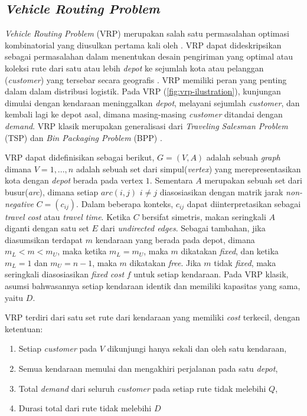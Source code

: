 \subsection{\textit{Vehicle Routing Problem}}
\label{ssec:vrp}
\textit{Vehicle Routing Problem} (VRP) merupakan salah satu permasalahan optimasi kombinatorial yang diusulkan pertama kali oleh \citep{dantzig_truck_1959}. VRP dapat dideskripsikan sebagai permasalahan dalam menentukan desain pengiriman yang optimal atau koleksi rute dari satu atau lebih \textit{depot} ke sejumlah kota atau pelanggan (\textit{customer}) yang tersebar secara geografis \citep{laporte_vehicle_1992}. VRP memiliki peran yang penting dalam dalam distribusi logistik. Pada VRP (\autoref{fig:vrp-ilustration}), kunjungan dimulai dengan kendaraan meninggalkan \textit{depot}, melayani sejumlah \textit{customer}, dan kembali lagi ke depot asal, dimana masing-masing \textit{customer} ditandai dengan \textit{demand}. VRP klasik merupakan generalisasi dari \textit{Traveling Salesman Problem} (TSP) dan \textit{Bin Packaging Problem} (BPP) \citep{garey_computers_2002}.


VRP dapat didefinisikan sebagai berikut, $G = (V, A)$ adalah sebuah \textit{graph} dimana $V = {1,...,n}$ adalah sebuah set dari simpul(\textit{vertex}) yang merepresentasikan kota dengan \textit{depot} berada pada vertex $1$. Sementara $A$ merupakan sebuah set dari busur(\textit{arc}), dimana setiap $arc(i, j)$ $i \neq j$ diasosiasikan dengan matrik jarak \textit{non-negative} $C = (c_{ij})$. Dalam beberapa konteks, $c_{ij}$ dapat diinterpretasikan sebagai \textit{travel cost} atau \textit{travel time}. Ketika $C$ bersifat simetris, makan seringkali $A$ diganti dengan satu set $E$ dari \textit{undirected edges}. Sebagai tambahan, jika diasumsikan terdapat $m$ kendaraan yang berada pada depot, dimana $m_L < m < m_U$, maka ketika $m_L = m_U$, maka $m$ dikatakan \textit{fixed}, dan ketika $m_L = 1$ dan $m_U = n - 1$, maka $m$ dikatakan \textit{free}. Jika $m$ tidak \textit{fixed}, maka seringkali diasosiasikan \textit{fixed cost} $f$ untuk setiap kendaraan. Pada VRP klasik, asumsi bahwasannya setiap kendaraan identik dan memiliki kapasitas yang sama, yaitu $D$.


VRP terdiri dari satu set rute dari kendaraan yang memiliki \textit{cost} terkecil, dengan ketentuan:
\begin{enumerate}
\item Setiap \textit{customer} pada $V$ dikunjungi hanya sekali dan oleh satu kendaraan, 
\item Semua kendaraan memulai dan mengakhiri perjalanan pada satu \textit{depot}, 
\item Total \textit{demand} dari seluruh \textit{customer} pada setiap rute tidak melebihi $Q$, 
\item Durasi total dari rute tidak melebihi $D$
\end{enumerate}


